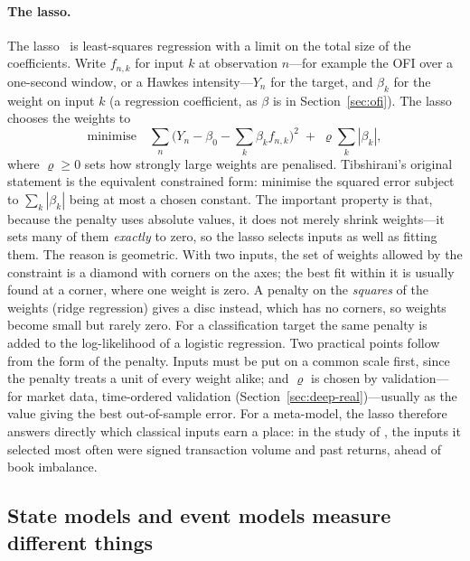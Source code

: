 \paragraph{The lasso.} The lasso~\citep{tibshirani1996} is least-squares regression with a limit on
the total size of the coefficients. Write $f_{n,k}$ for input $k$ at observation $n$---for example the OFI
over a one-second window, or a Hawkes intensity---$Y_n$ for the target, and $\beta_k$ for the weight on input
$k$ (a regression coefficient, as $\beta$ is in Section~\ref{sec:ofi}). The lasso chooses the weights to
\begin{equation}
  \text{minimise}\quad \sum_{n} \Big(Y_n - \beta_0 - \sum_{k} \beta_k f_{n,k}\Big)^2
  \;+\; \varrho \sum_{k} |\beta_k| ,
\end{equation}
where $\varrho \ge 0$ sets how strongly large weights are penalised.
 Tibshirani's original statement is the equivalent constrained form: minimise the squared
error subject to $\sum_k |\beta_k|$ being at most a chosen constant. The important property is that, because
the penalty uses absolute values, it does not merely shrink weights---it sets many of them \emph{exactly} to
zero, so the lasso selects inputs as well as fitting them. The reason is geometric. With two inputs, the set
of weights allowed by the constraint is a diamond with corners on the axes; the best fit within it is
usually found at a corner, where one weight is zero. A penalty on the \emph{squares} of the weights (ridge
regression) gives a disc instead, which has no corners, so weights become small but rarely zero. For a
classification target the same penalty is added to the log-likelihood of a logistic regression. Two
practical points follow from the form of the penalty. Inputs must be put on a common scale first, since the
penalty treats a unit of every weight alike; and $\varrho$ is chosen by validation---for market data,
time-ordered validation (Section~\ref{sec:deep-real})---usually as the value giving the best out-of-sample
error. For a meta-model, the lasso therefore answers directly which classical inputs earn a place: in the
study of \citet{aitsahalia2026}, the inputs it selected most often were signed transaction volume and past
returns, ahead of book imbalance.

\subsection{State models and event models measure different things}
\label{sec:meta-state-event}

